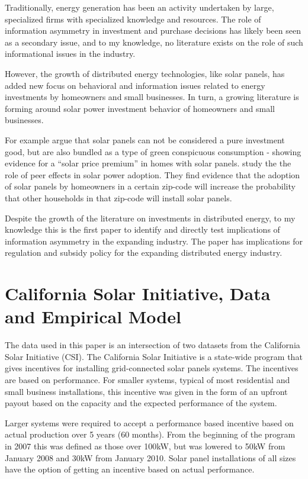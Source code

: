 \documentclass[12pt]{article}
\begin{document}
Traditionally, energy generation has been an activity undertaken by large, specialized firms with specialized knowledge and resources. The role of information asymmetry in investment and purchase decisions has likely been seen as a secondary issue, and to my knowledge, no literature exists on the role of such informational issues in the industry.

However, the growth of distributed energy technologies, like solar panels, has added new focus on behavioral and information issues related to energy investments by homeowners and small businesses. In turn, a growing literature is forming around solar power investment behavior of homeowners and small businesses.

For example \citet{dastrup_understanding_2012} argue that solar panels can not be considered a pure investment good, but are also bundled as a type of green conspicuous consumption - showing evidence for a ``solar price premium'' in homes with solar panels. \citet{bollinger_peer_2012} study the the role of peer effects in solar power adoption. They find evidence that the adoption of solar panels by homeowners in a certain zip-code will increase the probability that other households in that zip-code will install solar panels.

Despite the growth of the literature on investments in distributed energy, to my knowledge this is the first paper to identify and directly test implications of information asymmetry in the expanding industry. The paper has implications for regulation and subsidy policy for the expanding distributed energy industry.

\section{California Solar Initiative, Data and Empirical Model}

The data used in this paper is an intersection of two datasets from the California Solar Initiative (CSI). The California Solar Initiative is a state-wide program that gives incentives for installing grid-connected solar panels systems. The incentives are based on performance. For smaller systems, typical of most residential and small business installations, this incentive was given in the form of an upfront payout based on the capacity and the expected performance of the system.

Larger systems were required to accept a performance based incentive based on actual production over 5 years (60 months). From the beginning of the program in 2007 this was defined as those over 100kW, but was lowered to 50kW from January 2008 and 30kW from January 2010. Solar panel installations of all sizes have the option of getting an incentive based on actual performance.
\end{document}
